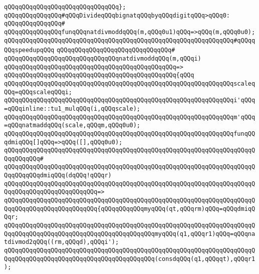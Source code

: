 \verb|qQQqqQQqqQQqqQQqqQQqqQQqqQQqqQQq};|\newline
\newline
\verb|qQQqqQQqqQQqqQQq#qQQqDivideqQQqbignatqQQqbyqQQqdigitqQQq>qQQq0:|\newline
\verb|qQQqqQQqqQQqqQQq#|\newline
\verb|qQQqqQQqqQQqqQQqfunqQQqnatdivmoddqQQq(m,qQQq0u1)qQQq=>qQQq(m,qQQq0u0);qQQqqQQqqQQqqQQqqQQqqQQqqQQqqQQqqQQqqQQqqQQqqQQqqQQqqQQqqQQqqQQq#qQQqqQQqspeedupqQQq|\newline
\verb|qQQqqQQqqQQqqQQqqQQqqQQqqQQqqQQq#|\newline
\verb|qQQqqQQqqQQqqQQqqQQqqQQqqQQqqQQqnatdivmoddqQQq(m,qQQqi)|\newline
\verb|qQQqqQQqqQQqqQQqqQQqqQQqqQQqqQQqqQQqqQQqqQQqqQQq=>|\newline
\verb|qQQqqQQqqQQqqQQqqQQqqQQqqQQqqQQqqQQqqQQqqQQqqQQq{qQQq|\newline
\verb|qQQqqQQqqQQqqQQqqQQqqQQqqQQqqQQqqQQqqQQqqQQqqQQqqQQqqQQqqQQqqQQqscaleqQQq=qQQqscaleqQQqi;|\newline
\verb|qQQqqQQqqQQqqQQqqQQqqQQqqQQqqQQqqQQqqQQqqQQqqQQqqQQqqQQqqQQqqQQqi'qQQq=qQQqinline::tu1_mulqQQq(i,qQQqscale);|\newline
\verb|qQQqqQQqqQQqqQQqqQQqqQQqqQQqqQQqqQQqqQQqqQQqqQQqqQQqqQQqqQQqqQQqm'qQQq=qQQqnatmaddqQQq(scale,qQQqm,qQQq0u0);|\newline
\newline
\verb|qQQqqQQqqQQqqQQqqQQqqQQqqQQqqQQqqQQqqQQqqQQqqQQqqQQqqQQqqQQqqQQqfunqQQqdmiqQQq[]qQQq=>qQQq([],qQQq0u0);|\newline
\verb|qQQqqQQqqQQqqQQqqQQqqQQqqQQqqQQqqQQqqQQqqQQqqQQqqQQqqQQqqQQqqQQqqQQqqQQqqQQqqQQq#|\newline
\verb|qQQqqQQqqQQqqQQqqQQqqQQqqQQqqQQqqQQqqQQqqQQqqQQqqQQqqQQqqQQqqQQqqQQqqQQqqQQqqQQqdmiqQQq(dqQQq!qQQqr)|\newline
\verb|qQQqqQQqqQQqqQQqqQQqqQQqqQQqqQQqqQQqqQQqqQQqqQQqqQQqqQQqqQQqqQQqqQQqqQQqqQQqqQQqqQQqqQQqqQQqqQQq=>|\newline
\verb|qQQqqQQqqQQqqQQqqQQqqQQqqQQqqQQqqQQqqQQqqQQqqQQqqQQqqQQqqQQqqQQqqQQqqQQqqQQqqQQqqQQqqQQqqQQqqQQq{qQQqqQQqqQQqmyqQQq(qt,qQQqrm)qQQq=qQQqdmiqQQqr;|\newline
\verb|qQQqqQQqqQQqqQQqqQQqqQQqqQQqqQQqqQQqqQQqqQQqqQQqqQQqqQQqqQQqqQQqqQQqqQQqqQQqqQQqqQQqqQQqqQQqqQQqqQQqqQQqqQQqqQQqmyqQQq(q1,qQQqr1)qQQq=qQQqnatdivmod2qQQq((rm,qQQqd),qQQqi');|\newline
\newline
\verb|qQQqqQQqqQQqqQQqqQQqqQQqqQQqqQQqqQQqqQQqqQQqqQQqqQQqqQQqqQQqqQQqqQQqqQQqqQQqqQQqqQQqqQQqqQQqqQQqqQQqqQQqqQQqqQQq(consdqQQq(q1,qQQqqt),qQQqr1);|\newline
